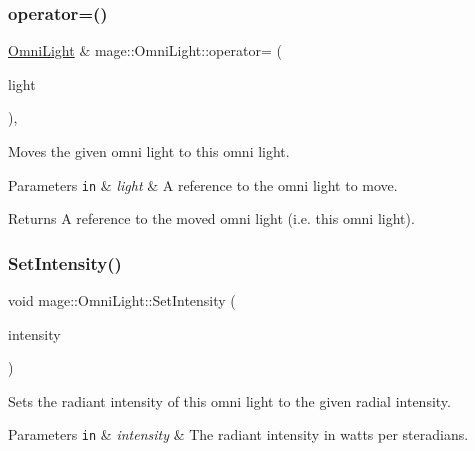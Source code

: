\subsubsection{\texorpdfstring{operator=()}{operator=()}\hspace{0.1cm}{\footnotesize\ttfamily [2/2]}}
{\footnotesize\ttfamily \hyperlink{classmage_1_1_omni_light}{Omni\+Light} \& mage\+::\+Omni\+Light\+::operator= (\begin{DoxyParamCaption}\item[{\hyperlink{classmage_1_1_omni_light}{Omni\+Light} \&\&}]{light }\end{DoxyParamCaption})\hspace{0.3cm}{\ttfamily [default]}, {\ttfamily [noexcept]}}

Moves the given omni light to this omni light.


\begin{DoxyParams}[1]{Parameters}
\mbox{\tt in}  & {\em light} & A reference to the omni light to move. \\
\hline
\end{DoxyParams}
\begin{DoxyReturn}{Returns}
A reference to the moved omni light (i.\+e. this omni light). 
\end{DoxyReturn}
\hypertarget{classmage_1_1_omni_light_add3fece8f288f4d4b55357143faa490b}{}\label{classmage_1_1_omni_light_add3fece8f288f4d4b55357143faa490b} 
\subsubsection{\texorpdfstring{Set\+Intensity()}{SetIntensity()}}
{\footnotesize\ttfamily void mage\+::\+Omni\+Light\+::\+Set\+Intensity (\begin{DoxyParamCaption}\item[{\hyperlink{namespacemage_aa97e833b45f06d60a0a9c4fc22ae02c0}{F32}}]{intensity }\end{DoxyParamCaption})\hspace{0.3cm}{\ttfamily [noexcept]}}

Sets the radiant intensity of this omni light to the given radial intensity.


\begin{DoxyParams}[1]{Parameters}
\mbox{\tt in}  & {\em intensity} & The radiant intensity in watts per steradians. \\
\hline
\end{DoxyParams}
\hypertarget{classmage_1_1_omni_light_a03f277ecf566147aa54c95816871de10}{}\label{classmage_1_1_omni_light_a03f277ecf566147aa54c95816871de10} 

